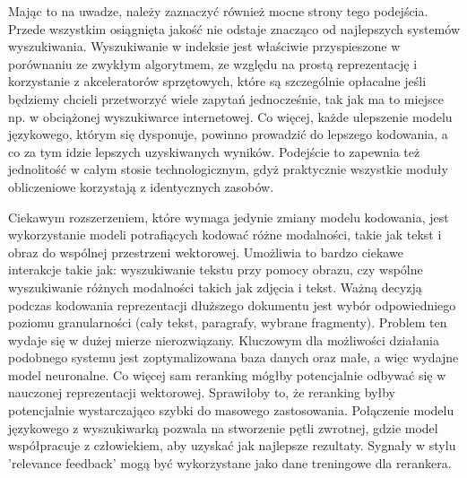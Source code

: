 Mając to na uwadze, należy zaznaczyć również mocne strony tego podejścia.
Przede wszystkim osiągnięta jakość nie odstaje znacząco od najlepszych systemów wyszukiwania. Wyszukiwanie w indeksie jest właściwie przyspieszone w porównaniu ze zwykłym algorytmem, ze względu na prostą reprezentację i korzystanie z akceleratorów sprzętowych, które są szczególnie opłacalne jeśli będziemy chcieli przetworzyć wiele zapytań jednocześnie, tak jak ma to miejsce np. w obciążonej wyszukiwarce internetowej. Co więcej, każde ulepszenie modelu językowego, którym się dysponuje, powinno prowadzić do lepszego kodowania, a co za tym idzie lepszych uzyskiwanych wyników. Podejście to zapewnia też jednolitość w całym stosie technologicznym, gdyż praktycznie wszystkie moduły obliczeniowe korzystają z identycznych zasobów. \newline

Ciekawym rozszerzeniem, które wymaga jedynie zmiany modelu kodowania, jest wykorzystanie modeli potrafiących kodować różne modalności, takie jak tekst i obraz do wspólnej przestrzeni wektorowej. Umożliwia to bardzo ciekawe interakcje takie jak: wyszukiwanie tekstu przy pomocy obrazu, czy wspólne wyszukiwanie różnych modalności takich jak zdjęcia i tekst. Ważną decyzją podczas kodowania reprezentacji dłuższego dokumentu jest wybór odpowiedniego poziomu granularności (cały tekst, paragrafy, wybrane fragmenty). Problem ten wydaje się w dużej mierze nierozwiązany. Kluczowym dla możliwości działania podobnego systemu jest zoptymalizowana baza danych oraz małe, a więc wydajne model neuronalne. Co więcej sam reranking mógłby potencjalnie odbywać się w nauczonej reprezentacji wektorowej. Sprawiłoby to, że reranking byłby potencjalnie wystarczająco szybki do masowego zastosowania. Połączenie modelu językowego z wyszukiwarką pozwala na stworzenie pętli zwrotnej, gdzie model współpracuje z człowiekiem, aby uzyskać jak najlepsze rezultaty. Sygnały w stylu 'relevance feedback' mogą być wykorzystane jako dane treningowe dla rerankera.\newline

